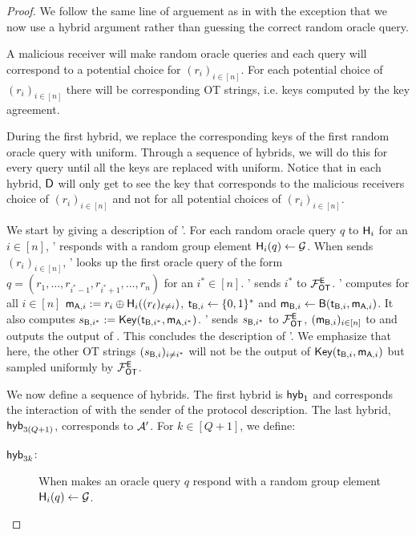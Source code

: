 \begin{proof}
We follow the same line of arguement as in  with the exception that we now use a hybrid argument rather than guessing the correct random oracle query. 

A malicious receiver will make random oracle queries and each query will correspond to a potential choice for $(r_i)_{i\in[n]}$. For each potential choice of $(r_i)_{i\in[n]}$ there will be corresponding OT strings, i.e. keys computed by the key agreement.
 
During the first hybrid, we replace the corresponding keys of the first random oracle query with uniform. Through a sequence of hybrids, we will do this for every query until all the keys are replaced with uniform. Notice that in each hybrid, $\mathsf D$ will only get to see the key that corresponds to the malicious receivers choice of $(r_i)_{i\in[n]}$ and not for all potential choices of $(r_i)_{i\in[n]}$.


We start by giving a description of \Adv'. For each random oracle query $q$ to $\mathsf{H}_i$ for an $i\in[n]$, \Adv' responds with a random group element $\mathsf{H}_i(q)\leftarrow\mathcal{G}$.
 When \Adv sends $(r_i)_{i\in[n]}$, \Adv' looks up the first oracle query of the form $q= (r_1,\dots, r_{i^*-1},r_{i^*+1},\dots, r_{n})$ for an $i^*\in[n]$. \Adv' sends $i^*$ to $\mathcal{F}_{\mathsf{OT}}^\mathsf{E}$. \Adv' computes for all $i\in[n]$ $\mathsf{m}_{\mathsf{A},i}:=r_i\oplus\mathsf{H}_i((r_\ell)_{\ell\neq i})$, $\mathsf{t}_{\mathsf{B},i}\leftarrow\{0,1\}^*$ and $\mathsf{m}_{\mathsf{B},i}\leftarrow\mathsf{B}(\mathsf{t}_{\mathsf{B},i},\mathsf{m}_{\mathsf{A},i})$. It also computes $s_{\mathsf{B},i^*}:=\mathsf{Key}(\mathsf{t}_{\mathsf{B},i^*},\mathsf{m}_{\mathsf{A},i^*})$.
\Adv' sends $s_{\mathsf{B},i^*}$ to $\mathcal{F}_{\mathsf{OT}}^\mathsf{E}$, $(\mathsf{m}_{\mathsf{B},i})_{i\in[n]}$ to \Adv and outputs the output of \Adv. This concludes the description of \Adv'. We emphasize that here, the other OT strings $(s_{\mathsf{B},i})_{i\neq i^*}$ will not be the output of $\mathsf{Key}(\mathsf{t}_{\mathsf{B},i},\mathsf{m}_{\mathsf{A},i})$ but sampled uniformly by $\mathcal{F}_{\mathsf{OT}}^\mathsf{E}$.

We now define a sequence of hybrids. The first hybrid is $\mathsf{hyb}_1$ and corresponds the interaction of \Adv with the sender of the protocol description. The last hybrid, $\mathsf{hyb}_{3(Q+1)}$, corresponds to $\mathcal{A}'$.
For $k\in[Q+1]$, we define:
\begin{description}
\item[$\mathsf{hyb}_{3k}$:]  When \Adv makes an oracle query $q$ respond with a random group element $\mathsf{H}_i(q)\leftarrow\mathcal{G}$. 


\end{description}
\end{proof}
